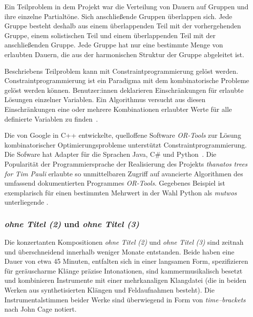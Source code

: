 \documentclass[12pt,a4paper,ngerman]{article}
\begin{document}
\bigskip


Ein Teilproblem in dem Projekt war die Verteilung von Dauern auf Gruppen und ihre einzelne Partialtöne.
Sich anschließende Gruppen überlappen sich.
Jede Gruppe besteht deshalb aus einem überlappenden Teil mit der vorhergehenden Gruppe, einem solistischen Teil und einem überlappenden Teil mit der anschließenden Gruppe.
Jede Gruppe hat nur eine bestimmte Menge von erlaubten Dauern, die aus der harmonischen Struktur der Gruppe abgeleitet ist.

\bigskip

Beschriebens Teilproblem kann mit Constraintprogrammierung gelöst werden.
Constraintprogrammierung ist ein Paradigma mit dem kombinatorische Probleme gelöst werden können.
Benutzer:innen deklarieren Einschränkungen für erlaubte Lösungen einzelner Variablen.
Ein Algorithmus versucht aus diesen Einschränkungen eine oder mehrere Kombinationen erlaubter Werte für alle definierte Variablen zu finden~\parencite{constraintProgramming}.

\bigskip

Die von Google in C++ entwickelte, quelloffene Software \emph{OR-Tools} zur Lösung kombinatorischer Optimierungsprobleme unterstützt Constraintprogrammierung.
Die Sofware hat Adapter für die Sprachen Java, C\# und Python~\parencite{orTools}.
Die Popularität der Programmiersprache der Realisierung des Projekts \emph{thanatos trees for Tim Pauli} erlaubte so unmittelbaren Zugriff auf avancierte Algorithmen des umfassend dokumentierten Programmes \emph{OR-Tools}.
Gegebenes Beispiel ist exemplarisch für einen bestimmten Mehrwert in der Wahl Python als \emph{mutwos} unterliegende \emph{}.


%
%



\subsubsection{\emph{ohne Titel (2)} und \emph{ohne Titel (3)}}

Die konzertanten Kompositionen \emph{ohne Titel (2)} und \emph{ohne Titel (3)} sind zeitnah und überschneidend innerhalb weniger Monate entstanden.
Beide haben eine Dauer von etwa 45 Minuten, entfalten sich in einer langsamen Form, spezifizieren für geräuscharme Klänge präzise Intonationen, sind kammermusikalisch besetzt und kombinieren Instrumente mit einer mehrkanaligen Klangdatei (die in beiden Werken aus synthetisierten Klängen und Feldaufnahmen besteht).
Die Instrumentalstimmen beider Werke sind überwiegend in Form von \emph{time--brackets} nach John Cage notiert.
\end{document}
